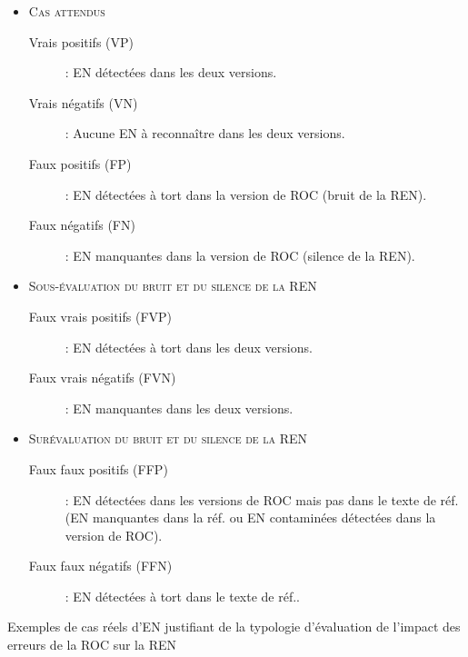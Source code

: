\begin{itemize}
\footnotesize

	\item[] \textsc{Cas attendus}
	
	
	\begin{description}

		\item[Vrais positifs (VP)]: EN détectées dans les deux versions.
		\item[Vrais négatifs (VN)]: Aucune EN à reconnaître dans les deux versions.
		\item[Faux positifs (FP)]: EN détectées à tort dans la version de ROC (bruit de la REN).
		\item[Faux négatifs (FN)]: EN manquantes dans la version de ROC (silence de la REN).
	\end{description}
	
		
	\item[] \textsc{Sous-évaluation du bruit et du silence de la REN}
	
	
	\begin{description}
	
		\item[Faux vrais positifs (FVP)]: EN détectées à tort dans les deux versions.
	
	 	\item[Faux vrais négatifs (FVN)] : EN manquantes dans les deux versions.
	 \end{description}
	 
	 \item[] \textsc{Surévaluation du bruit et du silence de la REN}
	
	\begin{description}
	
		\item[Faux faux positifs (FFP)]: EN détectées dans les versions de ROC mais pas dans le texte de réf. (EN manquantes dans la réf. ou EN contaminées détectées dans la version de ROC).
		
 		\item[Faux faux négatifs (FFN)]: EN  détectées à tort dans le texte de réf..

	\end{description}

\end{itemize}

\begin{table}[h!]
    \centering
    

    \caption{Exemples de cas réels d'EN justifiant de la typologie d'évaluation de l'impact des erreurs de la ROC sur la REN}
    \label{tab:typo_eval}
\end{table}

